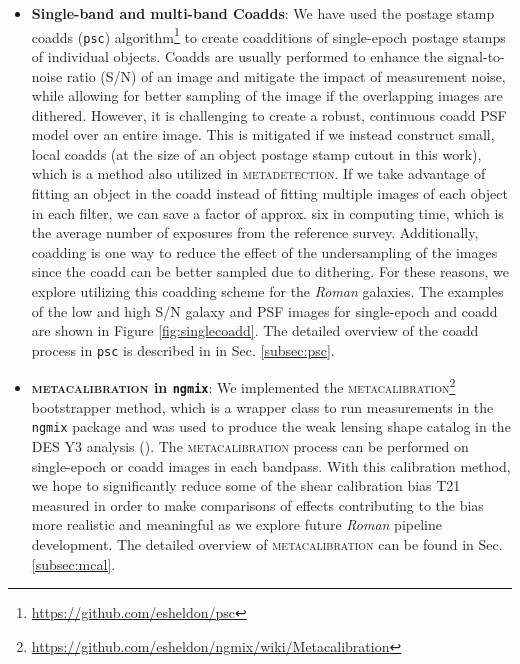 \documentclass[fleqn,usenatbib]{mnras}
\begin{document}
\begin{itemize}
    \item \textbf{Single-band and multi-band Coadds}: 
    We have used the postage stamp coadds (\texttt{psc}) algorithm\footnote{\url{https://github.com/esheldon/psc}} to create coadditions of single-epoch postage stamps of individual objects. Coadds are usually performed to enhance the signal-to-noise ratio (S/N) of an image and mitigate the impact of measurement noise, while allowing for better sampling of the image if the overlapping images are dithered. However, it is challenging to create a robust, continuous coadd PSF model over an entire image. This is mitigated if we instead construct small, local coadds (at the size of an object postage stamp cutout in this work), which is a method also utilized in \textsc{metadetection}. If we take advantage of fitting an object in the coadd instead of fitting multiple images of each object in each filter, we can save a factor of approx. six in computing time, which is the average number of exposures from the reference survey. Additionally, coadding is one way to reduce the effect of the undersampling of the images since the coadd can be better sampled due to dithering. For these reasons, we explore utilizing this coadding scheme for the \emph{Roman} galaxies. The examples of the low and high S/N galaxy and PSF images for single-epoch and coadd are shown in Figure \ref{fig:singlecoadd}. The detailed overview of the coadd process in \texttt{psc} is described in in Sec. \ref{subsec:psc}.
    
    \item \textbf{\textsc{metacalibration} in \texttt{ngmix}}: We implemented the \textsc{metacalibration}\footnote{\url{https://github.com/esheldon/ngmix/wiki/Metacalibration}} bootstrapper method, which is a wrapper class to run measurements in the \texttt{ngmix} package and was used to produce the weak lensing shape catalog in the DES Y3 analysis (\citealt{2020arXiv201103408G}). The \textsc{metacalibration} process can be performed on single-epoch or coadd images in each bandpass. With this calibration method, we hope to significantly reduce some of the shear calibration bias T21 measured in order to make comparisons of effects contributing to the bias more realistic and meaningful as we explore future \emph{Roman} pipeline development. The detailed overview of \textsc{metacalibration} can be found in Sec.\ref{subsec:mcal}. 
\end{itemize}
\end{document}
